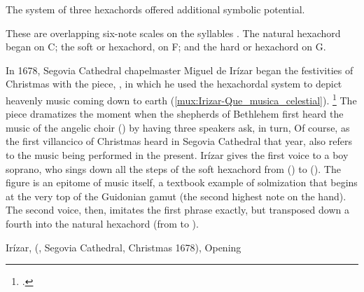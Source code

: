 The system of three hexachords offered additional symbolic potential.%
\begin{Footnote}
    These are overlapping six-note scales on the syllables .
    The natural hexachord began on C; the soft or  hexachord, on
    F; and the hard or  hexachord on G.
    \Autocites{Judd:RenaissanceModalTheory}
    {Barnett:TonalOrganization17C}
    {Berger:Ficta}
\end{Footnote}
In 1678, Segovia Cathedral chapelmaster Miguel de Irízar began the festivities
of Christmas with the  piece, , in
which he used the hexachordal system to depict heavenly music coming down to
earth (\cref{mux:Irizar-Que_musica_celestial}).%
    \footnote{.}
The piece dramatizes the moment when the shepherds of Bethlehem first heard the
music of the angelic choir () by having three speakers ask,
in turn,
Of course, as the first villancico of Christmas heard in Segovia Cathedral that
year,  also refers to the music being performed in
the present.
Irízar gives the first voice to a boy soprano, who sings down all the steps of
the soft hexachord from  () to  ().
The figure is an epitome of music itself, a textbook example of solmization
that begins at the very top of the Guidonian gamut (the second highest note on
the hand).
The second voice, then, imitates the first phrase exactly, but transposed down
a fourth into the natural hexachord (from  to ).

{Irízar,  (, Segovia Cathedral,
Christmas 1678), Opening}


